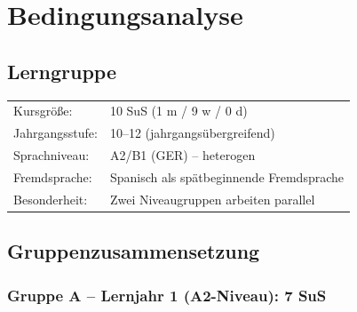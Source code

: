 \documentclass[11pt,a4paper]{article}
\newcommand{\jahrgangsstufe}{10--12}
\newcommand{\lerngruppengroesse}{10}
\newcommand{\maennlich}{1}
\newcommand{\weiblich}{9}
\newcommand{\divers}{0}
\newcommand{\gerniveau}{A2/B1}
\begin{document}
\section{Bedingungsanalyse}

\subsection{Lerngruppe}
\begin{tabular}{ll}
    Kursgröße: & \lerngruppengroesse{} SuS (\maennlich{} m / \weiblich{} w / \divers{} d) \\
    Jahrgangsstufe: & \jahrgangsstufe{} (jahrgangsübergreifend) \\
    Sprachniveau: & \gerniveau{} (GER) -- heterogen \\
    Fremdsprache: & Spanisch als spätbeginnende Fremdsprache \\
    Besonderheit: & Zwei Niveaugruppen arbeiten parallel \\
\end{tabular}

\subsection{Gruppenzusammensetzung}

\subsubsection{Gruppe A -- Lernjahr 1 (A2-Niveau): 7 SuS}
\end{document}
